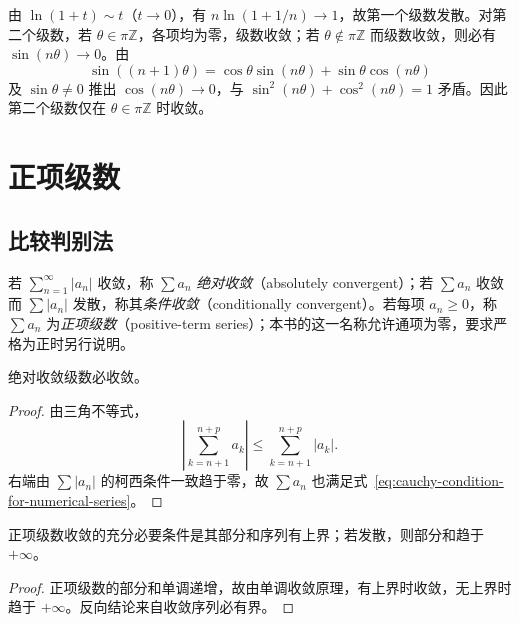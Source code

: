 \begin{solve}
由 $\ln(1+t)\sim t$（$t\to0$），有 $n\ln(1+1/n)\to1$，故第一个级数发散。对第二个级数，若 $\theta\in\pi\mathbb Z$，各项均为零，级数收敛；若 $\theta\notin\pi\mathbb Z$ 而级数收敛，则必有 $\sin(n\theta)\to0$。由
\[
    \sin((n+1)\theta)
    =\cos\theta\sin(n\theta)+\sin\theta\cos(n\theta)
\]
及 $\sin\theta\neq0$ 推出 $\cos(n\theta)\to0$，与 $\sin^2(n\theta)+\cos^2(n\theta)=1$ 矛盾。因此第二个级数仅在 $\theta\in\pi\mathbb Z$ 时收敛。
\end{solve}

\section{正项级数}
\label{sec:positive-term-series}

\subsection{比较判别法}
\label{subsec:comparison-tests-for-series}

\begin{definition}
若 $\sum_{n=1}^{\infty}|a_n|$ 收敛，称 $\sum a_n$ \emph{绝对收敛}（absolutely convergent）；若 $\sum a_n$ 收敛而 $\sum|a_n|$ 发散，称其\emph{条件收敛}（conditionally convergent）。若每项 $a_n\geq0$，称 $\sum a_n$ 为\emph{正项级数}（positive-term series）；本书的这一名称允许通项为零，要求严格为正时另行说明。
\end{definition}

\begin{proposition}
\label{prop:absolute-convergence-implies-convergence}
绝对收敛级数必收敛。
\end{proposition}

\begin{proof}
由三角不等式，
\[
    \left|\sum_{k=n+1}^{n+p}a_k\right|
    \leq\sum_{k=n+1}^{n+p}|a_k|.
\]
右端由 $\sum|a_n|$ 的柯西条件一致趋于零，故 $\sum a_n$ 也满足式~\eqref{eq:cauchy-condition-for-numerical-series}。
\end{proof}

\begin{theorem}[正项级数的有界性判据]
\label{thm:positive-series-bounded-partial-sums}
正项级数收敛的充分必要条件是其部分和序列有上界；若发散，则部分和趋于 $+\infty$。
\end{theorem}

\begin{proof}
正项级数的部分和单调递增，故由单调收敛原理，有上界时收敛，无上界时趋于 $+\infty$。反向结论来自收敛序列必有界。
\end{proof}

